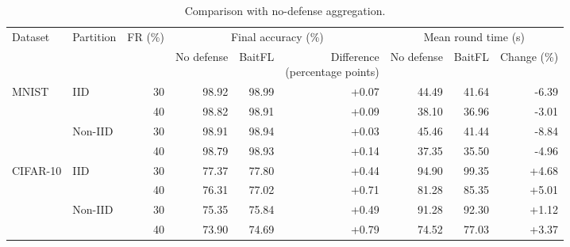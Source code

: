 \begin{table}[t]\centering\footnotesize\setlength{\tabcolsep}{5pt}
\caption{Comparison with no-defense aggregation.}\label{tab:baseline}
\begin{tabular}{llrrrrrrr}\toprule
\multirow{2}{*}{Dataset} & \multirow{2}{*}{Partition} & \multirow{2}{*}{FR (\%)} & \multicolumn{3}{c}{Final accuracy (\%)} & \multicolumn{3}{c}{Mean round time (s)} \\
\cmidrule(lr){4-6}\cmidrule(lr){7-9}
& & & No defense & BaitFL & \shortstack{Difference\\(percentage points)} & No defense & BaitFL & Change (\%) \\ \midrule
\multirow{4}{*}{MNIST} & \multirow{2}{*}{IID} & 30 & 98.92 & 98.99 & +0.07 & 44.49 & 41.64 & -6.39 \\
 &  & 40 & 98.82 & 98.91 & +0.09 & 38.10 & 36.96 & -3.01 \\
\cmidrule(lr){2-9}
 & \multirow{2}{*}{Non-IID} & 30 & 98.91 & 98.94 & +0.03 & 45.46 & 41.44 & -8.84 \\
 &  & 40 & 98.79 & 98.93 & +0.14 & 37.35 & 35.50 & -4.96 \\
\midrule
\multirow{4}{*}{CIFAR-10} & \multirow{2}{*}{IID} & 30 & 77.37 & 77.80 & +0.44 & 94.90 & 99.35 & +4.68 \\
 &  & 40 & 76.31 & 77.02 & +0.71 & 81.28 & 85.35 & +5.01 \\
\cmidrule(lr){2-9}
 & \multirow{2}{*}{Non-IID} & 30 & 75.35 & 75.84 & +0.49 & 91.28 & 92.30 & +1.12 \\
 &  & 40 & 73.90 & 74.69 & +0.79 & 74.52 & 77.03 & +3.37 \\
\bottomrule\end{tabular}\end{table}
